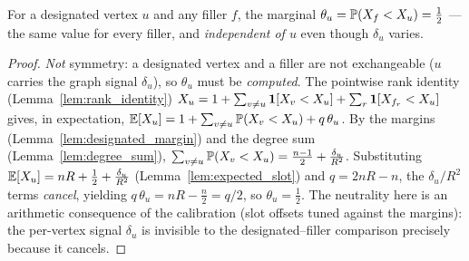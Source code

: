 \begin{lemma}
\label{lem:designated_filler_neutral_by_cancellation}
\leanok
{}
For a designated vertex $u$ and any filler $f$, the marginal
$\theta_u = \mathbb{P}(X_f < X_u) = \tfrac12$ --- the same value for every filler, and
\emph{independent of $u$} even though $\delta_u$ varies.
\end{lemma}
\begin{proof}
\leanok
{}
\emph{Not} symmetry: a designated vertex and a filler are not exchangeable ($u$
carries the graph signal $\delta_u$), so $\theta_u$ must be \emph{computed}. The
pointwise rank identity (Lemma~\ref{lem:rank_identity})
$X_u = 1 + \sum_{v \ne u}\mathbf{1}[X_v<X_u] + \sum_{r}\mathbf{1}[X_{f_r}<X_u]$ gives, in
expectation, $\mathbb{E}[X_u] = 1 + \sum_{v\ne u}\mathbb{P}(X_v<X_u) + q\,\theta_u$. By the
margins (Lemma~\ref{lem:designated_margin}) and the degree sum
(Lemma~\ref{lem:degree_sum}),
$\sum_{v\ne u}\mathbb{P}(X_v<X_u) = \tfrac{n-1}{2} + \tfrac{\delta_u}{R^2}$.
Substituting $\mathbb{E}[X_u] = nR + \tfrac12 + \tfrac{\delta_u}{R^2}$
(Lemma~\ref{lem:expected_slot}) and $q = 2nR - n$, the $\delta_u/R^2$ terms
\emph{cancel}, yielding $q\,\theta_u = nR - \tfrac n2 = q/2$, so
$\theta_u = \tfrac12$. The neutrality here is an arithmetic consequence of the
calibration (slot offsets tuned against the margins): the per-vertex signal
$\delta_u$ is invisible to the designated--filler comparison precisely because it
cancels.
\end{proof}

